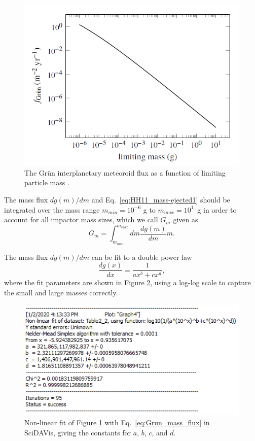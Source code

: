 \documentclass{hitec}
\begin{document}
\begin{figure}[h!]
	\centering
	\includegraphics[scale=0.65]{MEM_UG_Fig2.1_partile-mass-distribution.PNG}
	\caption{The Gr{\"u}n interplanetary meteoroid flux as a function of limiting particle mass \citep[Figure 1]{moorhead2019nasa}.}\label{fig:MEM_UG_Fig2.1_partile-mass-distribution}
\end{figure}

The mass flux $dg(m)/dm$ and Eq.\ \ref{eq:HH11_mass-ejected1} should be integrated over the mass range $m_{min} = 10^{-6}$ g to $m_{max} = 10^1$~g in order to account for all impactor mass sizes, which we call $G_m$ given as
\begin{equation}\label{eq:Gm_integral}
G_m = \int_{m_{min}}^{m_{max}}dm\frac{dg(m)}{dm}m.
\end{equation}

The mass flux $dg(m)/dm$ can be fit to a double power law
\begin{equation}\label{eq:Grun_mass_flux}
\frac{dg(x)}{dx} = \frac{1}{ax^b+cx^d},
\end{equation}
where the fit parameters are shown in Figure \ref{fig:Fit-to-D_Grun}, using a log-log scale to capture the small and large masses correctly.

\begin{figure}[h!]
	\centering
	\includegraphics[scale=1]{Fit-to-D_Grun.PNG}
	\caption{Non-linear fit of Figure \ref{fig:MEM_UG_Fig2.1_partile-mass-distribution} with Eq.\ \ref{eq:Grun_mass_flux} in \textsf{SciDAVis}, giving the constants for $a$, $b$, $c$, and $d$.}\label{fig:Fit-to-D_Grun}
\end{figure}
\end{document}
